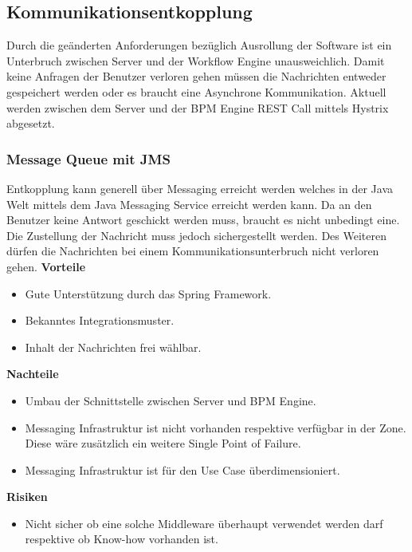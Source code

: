 \subsection{Kommunikationsentkopplung}

Durch die geänderten Anforderungen bezüglich Ausrollung der Software ist ein Unterbruch zwischen Server und der Workflow Engine unausweichlich. Damit keine Anfragen der Benutzer verloren gehen müssen die Nachrichten entweder gespeichert werden oder es braucht eine Asynchrone Kommunikation. Aktuell werden zwischen dem Server und der \Gls{BPM} Engine \gls{REST} Call mittels Hystrix abgesetzt.

\subsubsection{Message Queue mit JMS}

Entkopplung kann generell über Messaging erreicht werden welches in der Java Welt mittels dem Java Messaging Service erreicht werden kann. Da an den Benutzer keine Antwort geschickt werden muss, braucht es nicht unbedingt eine. Die Zustellung der Nachricht muss jedoch sichergestellt werden. Des Weiteren dürfen die Nachrichten bei einem Kommunikationsunterbruch nicht verloren gehen.
\newline
\newline
\textbf{Vorteile}
\begin{itemize}
	\item Gute Unterstützung durch das Spring Framework.
	\item Bekanntes Integrationsmuster.
	\item Inhalt der Nachrichten frei wählbar.
\end{itemize}
\textbf{Nachteile}
\begin{itemize}
	\item Umbau der Schnittstelle zwischen Server und BPM Engine.
	\item Messaging Infrastruktur ist nicht vorhanden respektive verfügbar in der Zone. Diese wäre zusätzlich ein weitere Single Point of Failure.
	\item Messaging Infrastruktur ist für den Use Case überdimensioniert.
\end{itemize}
\textbf{Risiken}
\begin{itemize}
	\item Nicht sicher ob eine solche Middleware überhaupt verwendet werden darf respektive ob Know-how vorhanden ist.
\end{itemize}

